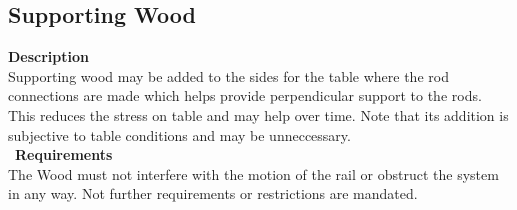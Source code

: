 \documentclass[titlepage]{article}
\begin{document}
\begin{center}
\begin{center}
\begin{center}
\begin{center}
\begin{center}
\begin{center}

\subsection{Supporting Wood}
\textbf{Description}\\
Supporting wood may be added to the sides for the table where the rod connections are made which helps provide perpendicular support to the rods. This reduces the stress on table and may help over time. Note that its addition is subjective to table conditions and may be unneccessary.\\\
\textbf{Requirements}\\
The Wood must not interfere with the motion of the rail or obstruct the system in any way. Not further requirements or restrictions are mandated.
\begin{center}





\newpage

\end{center}
\end{center}
\end{center}
\end{center}
\end{center}
\end{center}
\end{center}
\end{document}
